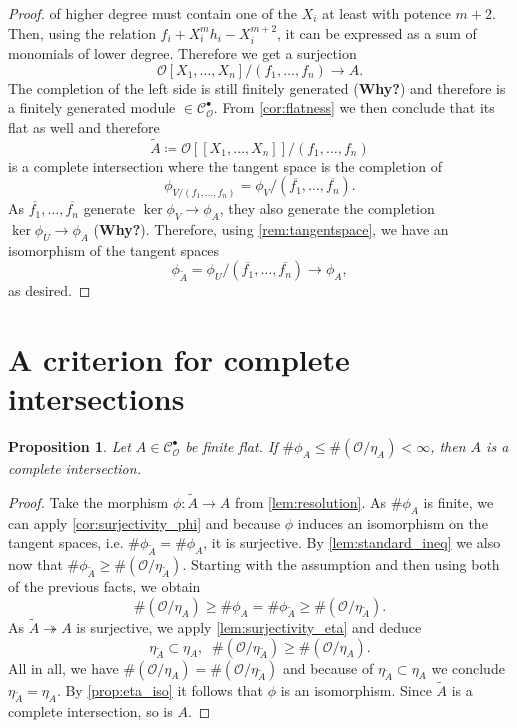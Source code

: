 \documentclass{article}
\theoremstyle{plain}%
\newtheorem{proposition}{Proposition}[section]
\theoremstyle{definition}
\theoremstyle{remark}
\newcommand{\cob}{\mathcal{C}_\mathcal{O}^\bullet}
\begin{document}
\begin{proof}
    of higher degree must contain one of the \(X_i\) at least with potence \(m+2\). Then, using
    the relation \(f_i + X_i^mh_i - X_i^{m+2}\), it can be expressed as a sum of 
    monomials of lower degree.
    Therefore we get a surjection 
    \[
        \mathcal{O}[X_1, \dots, X_n]/(f_1, \dots, f_n) \to A.  
    \]
    The completion of the left side is still finitely generated (\textbf{Why?}) and therefore is
    a finitely generated module \(\in \cob\). From \cref{cor:flatness} we then
    conclude that its flat as well and therefore
    \[
        \tilde{A} \coloneqq \mathcal{O}[[X_1, \dots, X_n]]/(f_1, \dots, f_n)
    \]
    is a complete intersection where the tangent space is the completion of 
    \[
        \phi_{V/(f_1, \dots, f_n)} = \phi_V/(\overline{f_1}, \dots, \overline{f_n}).
    \]
    As \(\overline{f_1}, \dots, \overline{f_n}\) generate \(\ker \phi_V \to \phi_A\), they also generate 
    the completion \(\ker \phi_U \to \phi_A\) (\textbf{Why?}). Therefore, using \cref{rem:tangentspace}, 
    we have an isomorphism of the tangent spaces 
    \[
        \phi_{\tilde{A}} = \phi_U/(\overline{f_1}, \dots, \overline{f_n}) \to \phi_A,
    \]
    as desired.
\end{proof}

\section{A criterion for complete intersections}

\begin{proposition}\cite[theorem 5.27]{darmon1995fermat}\label{prop:criterionCI}
    Let \(A \in \cob\) be finite flat. If \(\# \phi_A \leq \#(\mathcal{O}/\eta_A) < \infty\), 
    then \(A\) is a complete intersection.
\end{proposition}
\begin{proof}
    Take the morphism \(\phi\colon \tilde{A} \to A\) from \cref{lem:resolution}.
    As \(\# \phi_A\) is finite, we can apply \cref{cor:surjectivity_phi} and because \(\phi\)
    induces an isomorphism on the tangent spaces, i.e. \(\# \phi_{\tilde{A}} = \#\phi_A\), it is surjective.
    By \cref{lem:standard_ineq} we also now that \(\#\phi_{\tilde{A}} \geq \#(\mathcal{O}/\eta_{\tilde{A}})\).
    Starting with the assumption and then using both of the previous facts, we obtain
    \[
        \#(\mathcal{O}/\eta_A) \geq \#\phi_A = \#\phi_{\tilde{A}} \geq \#(\mathcal{O}/\eta_{\tilde{A}}).
    \]
    As \(\tilde{A} \twoheadrightarrow A\) is surjective, we apply \cref{lem:surjectivity_eta} 
    and deduce 
    \[
        \eta_{\tilde{A}} \subset \eta_A, \;\; \#(\mathcal{O}/\eta_{\tilde{A}}) \geq \#(\mathcal{O}/\eta_A).
    \]
    All in all, we have \(\#(\mathcal{O}/\eta_A) = \#(\mathcal{O}/\eta_{\tilde{A}})\) and because of
    \(\eta_{\tilde{A}} \subset \eta_A\) we conclude \(\eta_{\tilde{A}} = \eta_A\).
    By \cref{prop:eta_iso} it follows that \(\phi\) is an isomorphism.
    Since \(\tilde{A}\) is a complete intersection, so is \(A\).
\end{proof}
\end{document}
